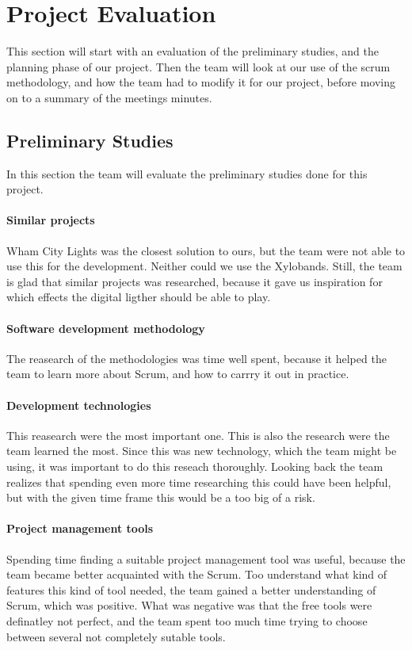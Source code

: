 \section{Project Evaluation}
This section will start with an evaluation of the preliminary studies, and the planning phase of our project.  
Then the team will look at our use of the scrum methodology, and how the team had to modify it for our project, before moving on to a summary of the meetings minutes. 

\subsection{Preliminary Studies}
In this section the team will evaluate the preliminary studies done for this project.
\paragraph{Similar projects} 
Wham City Lights was the closest solution to ours, but the team were not able to use this for the development. Neither could we use the Xylobands. Still, the team is glad that similar projects was researched, because it gave us inspiration for which effects the digital ligther should be able to play.

\paragraph{Software development methodology}
The reasearch of the methodologies was time well spent, because it helped the team to learn more about Scrum, and how to carrry it out in practice.

\paragraph{Development technologies}
This reasearch were the most important one. This is also the research were the team learned the most. Since this was new technology, which the team might be using, it was important to do this reseach thoroughly. Looking back the team realizes that spending even more time researching this could have been helpful, but with the given time frame this would be a too big of a risk. 

\paragraph{Project management tools}
Spending time finding a suitable project management tool was useful, because the team became better acquainted with the Scrum. Too understand what kind of features this kind of tool needed, the team gained a better understanding of Scrum, which was positive. What was negative was that the free tools were definatley not perfect, and the team spent too much time trying to choose between several not completely sutable tools. 

